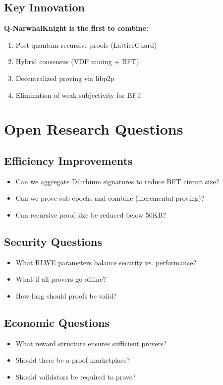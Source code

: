 \documentclass[11pt,a4paper]{article}
\begin{document}
\subsection{Key Innovation}

\textbf{Q-NarwhalKnight is the first to combine:}
\begin{enumerate}
    \item Post-quantum recursive proofs (LatticeGuard)
    \item Hybrid consensus (VDF mining + BFT)
    \item Decentralized proving via libp2p
    \item Elimination of weak subjectivity for BFT
\end{enumerate}

\section{Open Research Questions}

\subsection{Efficiency Improvements}
\begin{itemize}
    \item Can we aggregate Dilithium signatures to reduce BFT circuit size?
    \item Can we prove sub-epochs and combine (incremental proving)?
    \item Can recursive proof size be reduced below 50KB?
\end{itemize}

\subsection{Security Questions}
\begin{itemize}
    \item What RLWE parameters balance security vs. performance?
    \item What if all provers go offline?
    \item How long should proofs be valid?
\end{itemize}

\subsection{Economic Questions}
\begin{itemize}
    \item What reward structure ensures sufficient provers?
    \item Should there be a proof marketplace?
    \item Should validators be required to prove?
\end{itemize}
\end{document}
